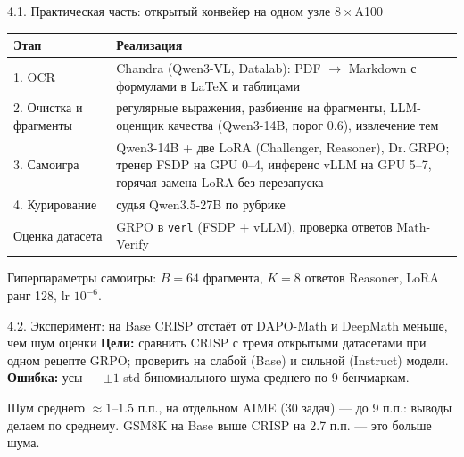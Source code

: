 \documentclass[aspectratio=169]{beamer}
\begin{document}
\begin{frame}{4.1. Практическая часть: открытый конвейер на одном узле $8\times$A100}
\small
\begin{tabular}{p{}p{}}
\toprule
Этап & Реализация \\
\midrule
1. OCR & Chandra (Qwen3-VL, Datalab): PDF $\to$ Markdown с формулами в LaTeX и таблицами \\
2. Очистка и фрагменты & регулярные выражения, разбиение на фрагменты, LLM-оценщик качества (Qwen3-14B, порог $0.6$), извлечение тем \\
3. Самоигра & Qwen3-14B + две LoRA (Challenger, Reasoner), Dr.\,GRPO; тренер FSDP на GPU 0--4, инференс vLLM на GPU 5--7, горячая замена LoRA без перезапуска \\
4. Курирование & судья Qwen3.5-27B по рубрике \\
\midrule
Оценка датасета & GRPO в \texttt{verl} (FSDP + vLLM), проверка ответов Math-Verify \\
\bottomrule
\end{tabular}

\vspace{6pt}
Гиперпараметры самоигры: $B{=}64$ фрагмента, $K{=}8$ ответов Reasoner, LoRA ранг 128, lr $10^{-6}$.
\end{frame}

\begin{frame}{4.2. Эксперимент: на Base CRISP отстаёт от DAPO-Math и DeepMath меньше, чем шум оценки}
\small
\textbf{Цели:} сравнить CRISP с тремя открытыми датасетами при одном рецепте GRPO; проверить на слабой (Base) и сильной (Instruct) модели.
\textbf{Ошибка:} усы --- $\pm1$ std биномиального шума среднего по 9 бенчмаркам.

\centering
{}

\raggedright
Шум среднего $\approx 1$--$1.5$ п.п., на отдельном AIME (30 задач) --- до 9 п.п.: выводы делаем по среднему. GSM8K на Base выше CRISP на 2.7 п.п. --- это больше шума.
\end{frame}
\end{document}
